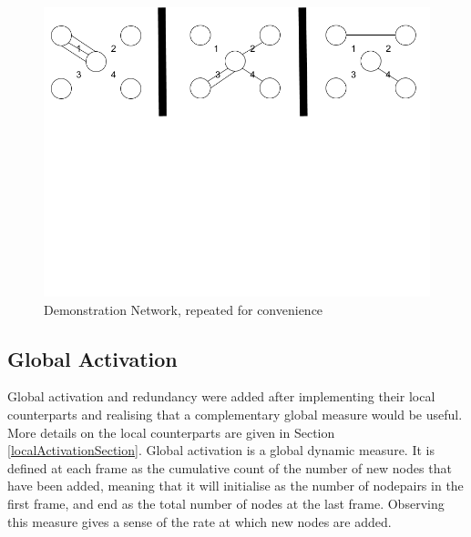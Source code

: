 \begin{figure}[h!]
  \begin{center}
  \includegraphics[trim={0 11cm 0 0}, clip, width=140mm]{./Figures/globalMeasuresReferenceNetwork.png}
  \end{center}
  \caption{Demonstration Network, repeated for convenience}
  \label{fig:demonstrationNetwork2}
\end{figure}







\subsection{Global Activation}
Global activation and redundancy were added after implementing their local counterparts and realising that a complementary global measure would be useful. More details on the local counterparts are given in Section \ref{localActivationSection}. Global activation is a global dynamic measure. It is defined at each frame as the cumulative count of the number of new nodes that have been added, meaning that it will initialise as the number of nodepairs in the first frame, and end as the total number of nodes at the last frame. Observing this measure gives a sense of the rate at which new nodes are added. 

